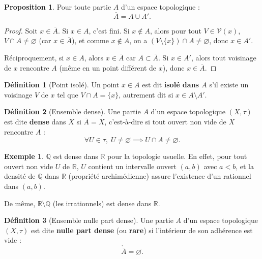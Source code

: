 \documentclass[12pt,a4paper,openany]{book}
\theoremstyle{definition}
\newtheorem{definition}{Définition}[chapter]
\theoremstyle{cours}
\newtheorem{proposition}[theoreme]{Proposition}
\theoremstyle{coursnormal}
\newtheorem{exemple}[theoreme]{Exemple}
\newcommand{\Q}{\mathbb{Q}}
\newcommand{\R}{\mathbb{R}}
\newcommand{\Int}[1]{\mathring{#1}}
\newcommand{\Cl}[1]{\overline{#1}}
\newcommand{\Vois}[1]{\mathcal{V}(#1)}
\begin{document}
\begin{proposition}\label{prop:adherence-derive}
  Pour toute partie $A$ d'un espace topologique :
  \[
    \Cl{A} = A \cup A'.
  \]
\end{proposition}

\begin{proof}
  Soit $x \in \Cl{A}$. Si $x \in A$, c'est fini. Si $x \notin A$, alors pour tout $V \in \Vois{x}$, $V \cap A \neq \varnothing$ (car $x \in \Cl{A}$), et comme $x \notin A$, on a $(V \setminus \{x\}) \cap A \neq \varnothing$, donc $x \in A'$.

  Réciproquement, si $x \in A$, alors $x \in \Cl{A}$ car $A \subset \Cl{A}$. Si $x \in A'$, alors tout voisinage de $x$ rencontre $A$ (même en un point différent de $x$), donc $x \in \Cl{A}$.
\end{proof}

\begin{definition}[Point isolé]\label{def:point-isole}
  Un point $x \in A$ est dit \textbf{isolé dans $A$} s'il existe un voisinage $V$ de $x$ tel que $V \cap A = \{x\}$, autrement dit si $x \in A \setminus A'$.
\end{definition}

\begin{definition}[Ensemble dense]\label{def:dense}
  Une partie $A$ d'un espace topologique $(X,\tau)$ est dite \textbf{dense} dans $X$ si $\Cl{A} = X$, c'est-à-dire si tout ouvert non vide de $X$ rencontre $A$ :
  \[
    \forall U \in \tau,\; U \neq \varnothing \implies U \cap A \neq \varnothing.
  \]
\end{definition}

\begin{exemple}\label{ex:Q-dense-R}
  \index{rationnels!denses dans $\R$}
  $\Q$ est dense dans $\R$ pour la topologie usuelle. En effet, pour tout ouvert non vide $U$ de $\R$, $U$ contient un intervalle ouvert $(a,b)$ avec $a < b$, et la densité de $\Q$ dans $\R$ (propriété archimédienne) assure l'existence d'un rationnel dans $(a,b)$.

  De même, $\R \setminus \Q$ (les irrationnels) est dense dans $\R$.
\end{exemple}

\begin{definition}[Ensemble nulle part dense]\label{def:nulle-part-dense}
  Une partie $A$ d'un espace topologique $(X,\tau)$ est dite \textbf{nulle part dense} (ou \textbf{rare}) si l'intérieur de son adhérence est vide :
  \[
    \Int{\Cl{A}} = \varnothing.
  \]
\end{definition}
\end{document}
